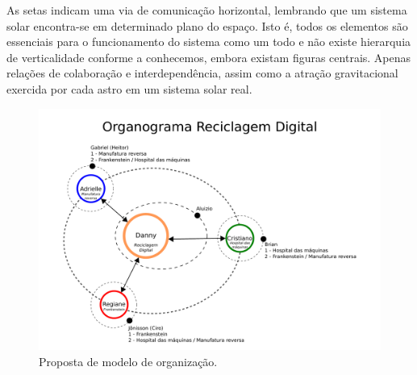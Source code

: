 \documentclass[
	12pt,				%
	openright,			%
	oneside,			%
	a4paper,			%
	english,			%
	spanish,			%
	brazil,				%
	]{abntex2}
\begin{document}
\begin{apendicesenv}
As setas indicam uma via de comunicação horizontal, lembrando que um sistema solar encontra-se em determinado plano do espaço. Isto é, todos os elementos são essenciais para o funcionamento do sistema como um todo e não existe hierarquia de verticalidade conforme a conhecemos, embora existam figuras centrais. Apenas relações de colaboração e interdependência, assim como a atração gravitacional exercida por cada astro em um sistema solar real.  	   
\begin{figure}[H]
 		\centering
 		\includegraphics[scale=0.8,angle=90]{figuras/organograma.pdf}
 		\caption{Proposta de modelo de organização.}  \label{fig:organograma} 
 		\end{figure} 

\end{apendicesenv}
\end{document}
